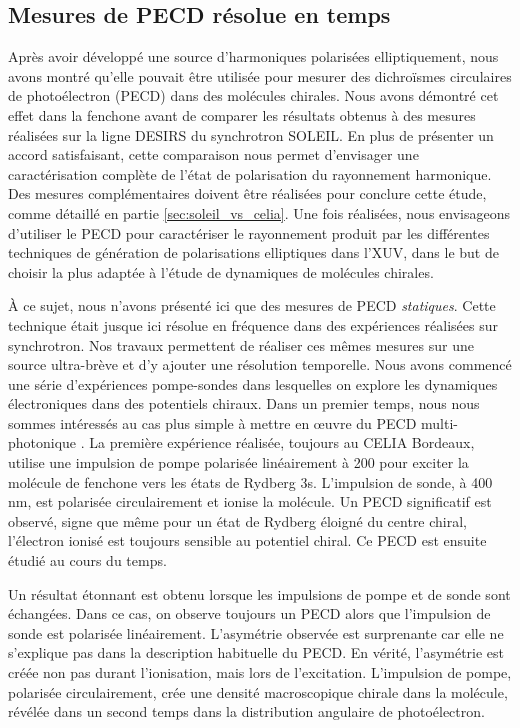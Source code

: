 \subsection{Mesures de PECD résolue en temps}
Après avoir développé une source d'harmoniques polarisées elliptiquement, nous avons montré qu'elle pouvait être utilisée pour mesurer des dichroïsmes circulaires de photoélectron (PECD) dans des molécules chirales. Nous avons démontré cet effet dans la fenchone avant de comparer les résultats obtenus à des mesures réalisées sur la ligne DESIRS du synchrotron SOLEIL. En plus de présenter un accord satisfaisant, cette comparaison nous permet d'envisager une caractérisation complète de l'état de polarisation du rayonnement harmonique. Des mesures complémentaires doivent être réalisées pour conclure cette étude, comme détaillé en partie \ref{sec:soleil_vs_celia}. Une fois réalisées, nous envisageons d'utiliser le PECD pour caractériser le rayonnement produit par les différentes techniques de génération de polarisations elliptiques dans l'XUV, dans le but de choisir la plus adaptée à l'étude de dynamiques de molécules chirales.

\`A ce sujet, nous n'avons présenté ici que des mesures de PECD \textit{statiques}. Cette technique était jusque ici résolue en fréquence dans des expériences réalisées sur synchrotron. Nos travaux permettent de réaliser ces mêmes mesures sur une source ultra-brève et d'y ajouter une résolution temporelle. Nous avons commencé une série d'expériences pompe-sondes dans lesquelles on explore les dynamiques électroniques dans des potentiels chiraux. Dans un premier temps, nous nous sommes intéressés au cas plus simple à mettre en œuvre du PECD multi-photonique . La première expérience réalisée, toujours au CELIA Bordeaux, utilise une impulsion de pompe polarisée linéairement à 200 pour exciter la molécule de fenchone vers les états de Rydberg 3s. L'impulsion de sonde, à 400 nm, est polarisée circulairement et ionise la molécule. Un PECD significatif est observé, signe que même pour un état de Rydberg éloigné du centre chiral, l'électron ionisé est toujours sensible au potentiel chiral. Ce PECD est ensuite étudié au cours du temps.

Un résultat étonnant est obtenu lorsque les impulsions de pompe et de sonde sont échangées. Dans ce cas, on observe toujours un PECD alors que l'impulsion de sonde est polarisée linéairement. L'asymétrie observée est surprenante car elle ne s'explique pas dans la description habituelle du PECD. En vérité, l'asymétrie est créée non pas durant l'ionisation, mais lors de l'excitation. L'impulsion de pompe, polarisée circulairement, crée une densité macroscopique chirale dans la molécule, révélée dans un second temps dans la distribution angulaire de photoélectron. 

